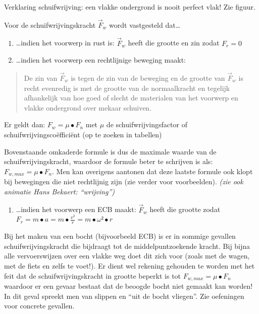 \documentclass{ximera}
\newcommand{\ul}[1]{#1}
\begin{document}
Verklaring schuifwrijving: een vlakke ondergrond is nooit perfect vlak!
Zie figuur.

Voor de \ul{schuif}wrijvingskracht \({\overrightarrow{F}}_{w}\) wordt
vastgesteld dat\ldots{}

\begin{enumerate}
\def\labelenumi{\alph{enumi})}
\item
  \ldots indien het voorwerp in rust is: \({\overrightarrow{F}}_{w}\)
  heeft die grootte en zin zodat \(F_{r} = 0\)
\item
  \ldots indien het voorwerp een rechtlijnige beweging maakt:
\end{enumerate}

\begin{quote}
De zin van \({\overrightarrow{F}}_{w}\) is tegen de zin van de beweging
en de grootte van \({\overrightarrow{F}}_{w}\) is recht evenredig is met
de grootte van de normaalkracht en tegelijk afhankelijk van hoe goed of
slecht de materialen van het voorwerp en vlakke ondergrond over mekaar
schuiven.
\end{quote}

Er geldt dan: \(F_{w} = \mu \bullet F_{n}\) met \(\mu\) de
schuifwrijvingsfactor of schuifwrijvingscoëfficiënt (op te zoeken in
tabellen)

Bovenstaande omkaderde formule is dus de maximale waarde van de
schuifwrijvingskracht, waardoor de formule beter te schrijven is als:
\(F_{w,max} = \mu \bullet F_{n}\). Men kan overigens aantonen dat deze
laatste formule ook klopt bij bewegingen die niet rechtlijnig zijn (zie
verder voor voorbeelden). \emph{(zie ook animatie Hans Bekaert:
``wrijving'')}

\begin{enumerate}
\def\labelenumi{\alph{enumi})}
\setcounter{enumi}{2}
\item
  \ldots indien het voorwerp een ECB maakt: \({\overrightarrow{F}}_{w}\)
  heeft die grootte zodat
  \(F_{r} = m \bullet a = m \bullet \frac{v^{2}}{r} = m \bullet \omega ² \bullet r\)
\end{enumerate}

Bij het maken van een bocht (bijvoorbeeld ECB) is er in sommige gevallen
schuifwrijvingskracht die bijdraagt tot de middelpuntzoekende kracht.
Bij bijna alle vervoerswijzen over een vlakke weg doet dit zich voor
(zoals met de wagen, met de fiets en zelfs te voet!). Er dient wel
rekening gehouden te worden met het feit dat de schuifwrijvingskracht in
grootte beperkt is tot \(F_{w,max} = \mu \bullet F_{n}\) waardoor er een
gevaar bestaat dat de beoogde bocht niet gemaakt kan worden! In dit
geval spreekt men van slippen en ``uit de bocht vliegen''. Zie
oefeningen voor concrete gevallen.
\end{document}
